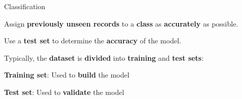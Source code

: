 \documentclass[aspectratio=169]{beamer}
\begin{document}
\begin{frame}{Classification}
    \begin{coloredblockicon}
        \vspace{.3cm}
        \begin{tugitemize}
            \item \scriptsize Assign \textbf{previously unseen records} to a \textbf{class} as \textbf{accurately} as possible.
            \item \scriptsize Use a \textbf{test set} to determine the \textbf{accuracy} of the model.
            \item \scriptsize Typically, the \textbf{dataset} is \textbf{divided} into \textbf{training} and \textbf{test sets}:
            \vspace{-.3cm}
            \begin{tugitemize}
                \item \scriptsize \textbf{Training set}: Used to \textbf{build} the model
                \item \scriptsize \textbf{Test set}: Used to \textbf{validate} the model
            \end{tugitemize}
        \end{tugitemize}
    \end{coloredblockicon}

\end{frame}
\end{document}

